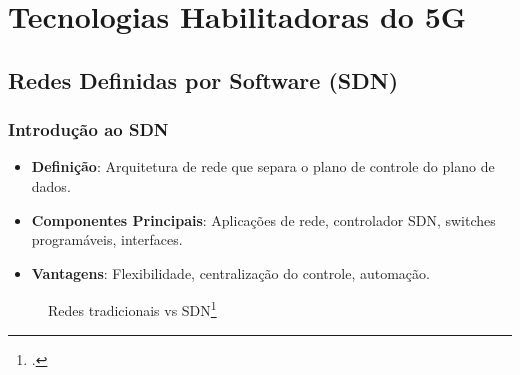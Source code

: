 
\section{Tecnologias Habilitadoras do 5G}
\subsection{Redes Definidas por Software (SDN)}

\begin{frame}
    \frametitle{Introdução ao SDN}

    \begin{itemize}
        \item \textbf{Definição}: Arquitetura de rede que separa o plano de controle do plano de dados.
        \item \textbf{Componentes Principais}: Aplicações de rede, controlador SDN, switches programáveis, interfaces.
        \item \textbf{Vantagens}: Flexibilidade, centralização do controle, automação.
    \end{itemize}
    \begin{figure}
        \centering
        \qquad
        \caption{Redes tradicionais vs SDN\footcite{Plane_Separation}}
        \end{figure}
\end{frame}

